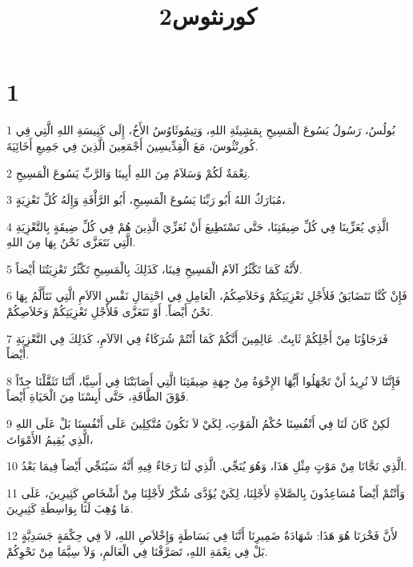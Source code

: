 

\title{2كورنثوس}


\chapter{1}

\par 1 بُولُسُ، رَسُولُ يَسُوعَ الْمَسِيحِ بِمَشِيئَةِ اللهِ، وَتِيمُوثَاوُسُ الأَخُ، إِلَى كَنِيسَةِ اللهِ الَّتِي فِي كُورِنْثُوسَ، مَعَ الْقِدِّيسِينَ أَجْمَعِينَ الَّذِينَ فِي جَمِيعِ أَخَائِيَةَ.
\par 2 نِعْمَةٌ لَكُمْ وَسَلاَمٌ مِنَ اللهِ أَبِينَا وَالرَّبِّ يَسُوعَ الْمَسِيحِ.
\par 3 مُبَارَكٌ اللهُ أَبُو رَبِّنَا يَسُوعَ الْمَسِيحِ، أَبُو الرَّأْفَةِ وَإِلَهُ كُلِّ تَعْزِيَةٍ،
\par 4 الَّذِي يُعَزِّينَا فِي كُلِّ ضِيقَتِنَا، حَتَّى نَسْتَطِيعَ أَنْ نُعَزِّيَ الَّذِينَ هُمْ فِي كُلِّ ضِيقَةٍ بِالتَّعْزِيَةِ الَّتِي نَتَعَزَّى نَحْنُ بِهَا مِنَ اللهِ.
\par 5 لأَنَّهُ كَمَا تَكْثُرُ آلاَمُ الْمَسِيحِ فِينَا، كَذَلِكَ بِالْمَسِيحِ تَكْثُرُ تَعْزِيَتُنَا أَيْضاً.
\par 6 فَإِنْ كُنَّا نَتَضَايَقُ فَلأَجْلِ تَعْزِيَتِكُمْ وَخَلاَصِكُمُ، الْعَامِلِ فِي احْتِمَالِ نَفْسِ الآلاَمِ الَّتِي نَتَأَلَّمُ بِهَا نَحْنُ أَيْضاً. أَوْ نَتَعَزَّى فَلأَجْلِ تَعْزِيَتِكُمْ وَخَلاَصِكُمْ.
\par 7 فَرَجَاؤُنَا مِنْ أَجْلِكُمْ ثَابِتٌ. عَالِمِينَ أَنَّكُمْ كَمَا أَنْتُمْ شُرَكَاءُ فِي الآلاَمِ، كَذَلِكَ فِي التَّعْزِيَةِ أَيْضاً.
\par 8 فَإِنَّنَا لاَ نُرِيدُ أَنْ تَجْهَلُوا أَيُّهَا الإِخْوَةُ مِنْ جِهَةِ ضِيقَتِنَا الَّتِي أَصَابَتْنَا فِي أَسِيَّا، أَنَّنَا تَثَقَّلْنَا جِدّاً فَوْقَ الطَّاقَةِ، حَتَّى أَيِسْنَا مِنَ الْحَيَاةِ أَيْضاً.
\par 9 لَكِنْ كَانَ لَنَا فِي أَنْفُسِنَا حُكْمُ الْمَوْتِ، لِكَيْ لاَ نَكُونَ مُتَّكِلِينَ عَلَى أَنْفُسِنَا بَلْ عَلَى اللهِ الَّذِي يُقِيمُ الأَمْوَاتَ،
\par 10 الَّذِي نَجَّانَا مِنْ مَوْتٍ مِثْلِ هَذَا، وَهُوَ يُنَجِّي. الَّذِي لَنَا رَجَاءٌ فِيهِ أَنَّهُ سَيُنَجِّي أَيْضاً فِيمَا بَعْدُ.
\par 11 وَأَنْتُمْ أَيْضاً مُسَاعِدُونَ بِالصَّلاَةِ لأَجْلِنَا، لِكَيْ يُؤَدَّى شُكْرٌ لأَجْلِنَا مِنْ أَشْخَاصٍ كَثِيرِينَ، عَلَى مَا وُهِبَ لَنَا بِوَاسِطَةِ كَثِيرِينَ.
\par 12 لأَنَّ فَخْرَنَا هُوَ هَذَا: شَهَادَةُ ضَمِيرِنَا أَنَّنَا فِي بَسَاطَةٍ وَإِخْلاَصِ اللهِ، لاَ فِي حِكْمَةٍ جَسَدِيَّةٍ بَلْ فِي نِعْمَةِ اللهِ، تَصَرَّفْنَا فِي الْعَالَمِ، وَلاَ سِيَّمَا مِنْ نَحْوِكُمْ.
